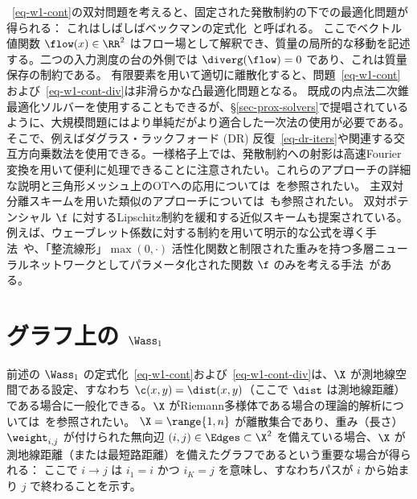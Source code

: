~\eqref{eq-w1-cont}の双対問題を考えると、固定された発散制約の下での最適化問題が得られる：
これはしばしばベックマンの定式化~\citep{Beckmann52}と呼ばれる。
%
ここでベクトル値関数 $\flow(x) \in \RR^2$ はフロー場として解釈でき、質量の局所的な移動を記述する。二つの入力測度の台の外側では $\diverg(\flow)=0$ であり、これは質量保存の制約である。
%
有限要素を用いて適切に離散化すると、問題~\eqref{eq-w1-cont}および~\eqref{eq-w1-cont-div}は非滑らかな凸最適化問題となる。
%
既成の内点法二次錐最適化ソルバーを使用することもできるが、\S\ref{sec-prox-solvers}で提唱されているように、大規模問題にはより単純だがより適合した一次法の使用が必要である。そこで、例えばダグラス・ラックフォード (DR) 反復~\eqref{eq-dr-iters}や関連する交互方向乗数法を使用できる。一様格子上では、発散制約への射影は高速Fourier変換を用いて便利に処理できることに注意されたい。これらのアプローチの詳細な説明と三角形メッシュ上のOTへの応用については~\citet{SolomonEMDSurfaces2014}を参照されたい。
%
主双対分離スキームを用いた類似のアプローチについては~\citet{LiRyuOsherYinGangbo2017_parallel,Ryu2017a,Ryu2017b}も参照されたい。
%
双対ポテンシャル $\f$ に対するLipschitz制約を緩和する近似スキームも提案されている。例えば、ウェーブレット係数に対する制約を用いて明示的な公式を導く手法~\citep{shirdhonkar2008approximate}や、「整流線形」$\max(0,\cdot)$ 活性化関数と制限された重みを持つ多層ニューラルネットワークとしてパラメータ化された関数 $\f$ のみを考える手法~\citep{WassersteinGAN}がある。



\section{グラフ上の $\Wass_1$}

前述の $\Wass_1$ の定式化~\eqref{eq-w1-cont}および~\eqref{eq-w1-cont-div}は、$\X$ が測地線空間である設定、すなわち $\c(x,y)=\dist(x,y)$（ここで $\dist$ は測地線距離）である場合に一般化できる。$\X$ がRiemann多様体である場合の理論的解析については~\citet{FeldmanMacCann02}を参照されたい。
%
$\X=\range{1,n}$ が離散集合であり、重み（長さ）$\weight_{i,j}$ が付けられた無向辺 $(i,j) \in \Edges \subset \X^2$ を備えている場合、$\X$ が測地線距離（または最短路距離）を備えたグラフであるという重要な場合が得られる：
ここで $i \rightarrow j$ は $i_1=i$ かつ $i_K=j$ を意味し、すなわちパスが $i$ から始まり $j$ で終わることを示す。

